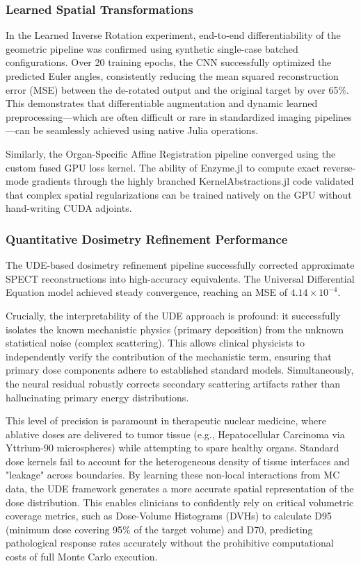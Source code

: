 \documentclass[10pt,letterpaper]{article}
\begin{document}
\subsubsection*{Learned Spatial Transformations}
In the Learned Inverse Rotation experiment, end-to-end differentiability of the geometric pipeline was confirmed using synthetic single-case batched configurations. Over 20 training epochs, the CNN successfully optimized the predicted Euler angles, consistently reducing the mean squared reconstruction error (MSE) between the de-rotated output and the original target by over 65\%. This demonstrates that differentiable augmentation and dynamic learned preprocessing---which are often difficult or rare in standardized imaging pipelines \cite{Shi_2023}---can be seamlessly achieved using native Julia operations.

Similarly, the Organ-Specific Affine Registration pipeline converged using the custom fused GPU loss kernel. The ability of Enzyme.jl to compute exact reverse-mode gradients through the highly branched KernelAbstractions.jl code validated that complex spatial regularizations can be trained natively on the GPU without hand-writing CUDA adjoints.

\subsubsection*{Quantitative Dosimetry Refinement Performance}
The UDE-based dosimetry refinement pipeline successfully corrected approximate SPECT reconstructions into high-accuracy equivalents. The Universal Differential Equation model achieved steady convergence, reaching an MSE of $4.14 \times 10^{-4}$. 

Crucially, the interpretability of the UDE approach is profound: it successfully isolates the known mechanistic physics (primary deposition) from the unknown statistical noise (complex scattering). This allows clinical physicists to independently verify the contribution of the mechanistic term, ensuring that primary dose components adhere to established standard models. Simultaneously, the neural residual robustly corrects secondary scattering artifacts rather than hallucinating primary energy distributions. 

This level of precision is paramount in therapeutic nuclear medicine, where ablative doses are delivered to tumor tissue (e.g., Hepatocellular Carcinoma via Yttrium-90 microspheres) while attempting to spare healthy organs. Standard dose kernels fail to account for the heterogeneous density of tissue interfaces and "leakage" across boundaries. By learning these non-local interactions from MC data, the UDE framework generates a more accurate spatial representation of the dose distribution. This enables clinicians to confidently rely on critical volumetric coverage metrics, such as Dose-Volume Histograms (DVHs) to calculate D95 (minimum dose covering 95\% of the target volume) and D70, predicting pathological response rates accurately without the prohibitive computational costs of full Monte Carlo execution.
\end{document}
